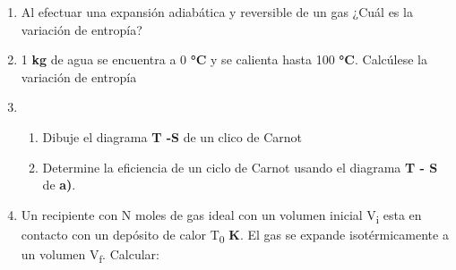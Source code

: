 \documentclass[a4paper,11pt]{extarticle} %
\newcommand{\ut}[1]{\textbf{#1}} %
\begin{document}
\begin{enumerate}[label=\textbf{\arabic*}), leftmargin=*]


    \item Al efectuar una expansión adiabática y reversible de un gas ¿Cuál es la variación de entropía?

    \vspace{\baselineskip}

    

    \vspace{\baselineskip}


    \item{ 1 \ut{kg} de agua se encuentra a 0 \ut{°C} y se calienta hasta 100 \ut{°C}. Calcúlese la variación
                de entropía
          }

    \vspace{\baselineskip}

    

    \vspace{\baselineskip}

    \item{
                \begin{enumerate}[label=\textbf{\alph* )}]
                    \item Dibuje el diagrama \ut{T -S } de un clico de Carnot
                    \item {Determine la eficiencia de un ciclo de Carnot usando el diagrama
                          \ut{T - S} de \ut{a)}}.
                \end{enumerate}
          }

    \vspace{\baselineskip}

    

    \vspace{\baselineskip}

    \item{Un recipiente con N moles de gas ideal con un volumen inicial V\textsubscript{i} esta en contacto con un
                depósito de calor T\textsubscript{0} \ut{K}. El gas se expande isotérmicamente a un volumen V\textsubscript{f}. Calcular:

}
\end{enumerate}
\end{document}
